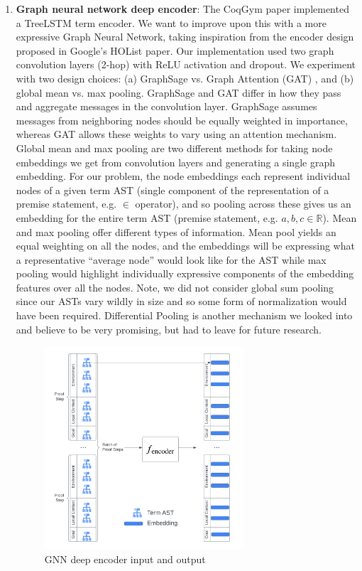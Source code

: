 \documentclass{article}
\begin{document}
\begin{enumerate}
    \item \textbf{Graph neural network deep encoder}: The CoqGym paper implemented a TreeLSTM term encoder. We want to improve upon this with a more expressive Graph Neural Network, taking inspiration from the encoder design proposed in Google's HOList paper. Our implementation used two graph convolution layers (2-hop) with ReLU activation and dropout. We experiment with two design choices: (a) GraphSage \cite{graphsage} vs. Graph Attention (GAT) \cite{gat}, and (b) global mean vs. max pooling. GraphSage and GAT differ in how they pass and aggregate messages in the convolution layer. GraphSage assumes messages from neighboring nodes should be equally weighted in importance, whereas GAT allows these weights to vary using an attention mechanism. Global mean and max pooling are two different methods for taking node embeddings we get from convolution layers and generating a single graph embedding. For our problem, the node embeddings each represent individual nodes of a given term AST (single component of the representation of a premise statement, e.g. $\in$ operator), and so pooling across these gives us an embedding for the entire term AST (premise statement, e.g. $a,b,c \in \mathbb{R}$). Mean and max pooling offer different types of information. Mean pool yields an equal weighting on all the nodes, and the embeddings will be expressing what a representative “average node” would look like for the AST while max pooling would highlight individually expressive components of the embedding features over all the nodes. Note, we did not consider global sum pooling since our ASTs vary wildly in size and so some form of normalization would have been required. Differential Pooling is another mechanism we looked into and believe to be very promising, but had to leave for future research.

    \begin{figure}[H]
        \centering
        \includegraphics[width=0.7\textwidth]{images/Encoder.png}
        \caption{GNN deep encoder input and output}
        \label{fig:encoder}
    \end{figure}
    

\end{enumerate}
\end{document}
